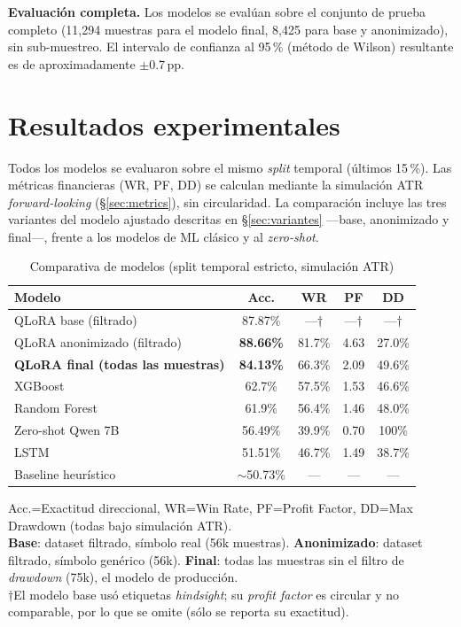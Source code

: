 \documentclass[10pt,twocolumn]{article}
\begin{document}
\textbf{Evaluaci\'on completa.} Los modelos se eval\'uan sobre el conjunto de prueba completo (11,294 muestras para el modelo final, 8,425 para base y anonimizado), sin sub-muestreo. El intervalo de confianza al 95\,\% (m\'etodo de Wilson) resultante es de aproximadamente $\pm$0.7\,pp.

\section{Resultados experimentales}

Todos los modelos se evaluaron sobre el mismo \textit{split} temporal (\'ultimos 15\,\%). Las m\'etricas financieras (WR, PF, DD) se calculan mediante la simulaci\'on ATR \textit{forward-looking} (\S\ref{sec:metrics}), sin circularidad. La comparaci\'on incluye las tres variantes del modelo ajustado descritas en \S\ref{sec:variantes} ---base, anonimizado y final---, frente a los modelos de ML cl\'asico y al \textit{zero-shot}.

\begin{table}[H]
\centering
\caption{Comparativa de modelos (split temporal estricto, simulaci\'on ATR)}
\label{tab:results}
\footnotesize
\begin{tabularx}{\columnwidth}{Xcccc}
\toprule
\textbf{Modelo} & \textbf{Acc.} & \textbf{WR} & \textbf{PF} & \textbf{DD} \\
\midrule
QLoRA base (filtrado) & 87.87\% & ---$\dagger$ & ---$\dagger$ & ---$\dagger$ \\
QLoRA anonimizado (filtrado) & \textbf{88.66\%} & 81.7\% & 4.63 & 27.0\% \\
\textbf{QLoRA final (todas las muestras)} & \textbf{84.13\%} & 66.3\% & 2.09 & 49.6\% \\
\midrule
XGBoost & 62.7\% & 57.5\% & 1.53 & 46.6\% \\
Random Forest & 61.9\% & 56.4\% & 1.46 & 48.0\% \\
Zero-shot Qwen 7B & 56.49\% & 39.9\% & 0.70 & 100\% \\
LSTM & 51.51\% & 46.7\% & 1.49 & 38.7\% \\
Baseline heur\'istico & $\sim$50.73\% & --- & --- & --- \\
\bottomrule
\end{tabularx}
{\scriptsize Acc.=Exactitud direccional, WR=Win Rate, PF=Profit Factor, DD=Max Drawdown (todas bajo simulaci\'on ATR).\\
\textbf{Base}: dataset filtrado, s\'imbolo real (56k muestras). \textbf{Anonimizado}: dataset filtrado, s\'imbolo gen\'erico (56k). \textbf{Final}: todas las muestras sin el filtro de \textit{drawdown} (75k), el modelo de producci\'on.\\
$\dagger$El modelo base us\'o etiquetas \textit{hindsight}; su \textit{profit factor} es circular y no comparable, por lo que se omite (s\'olo se reporta su exactitud).}
\end{table}
\end{document}
